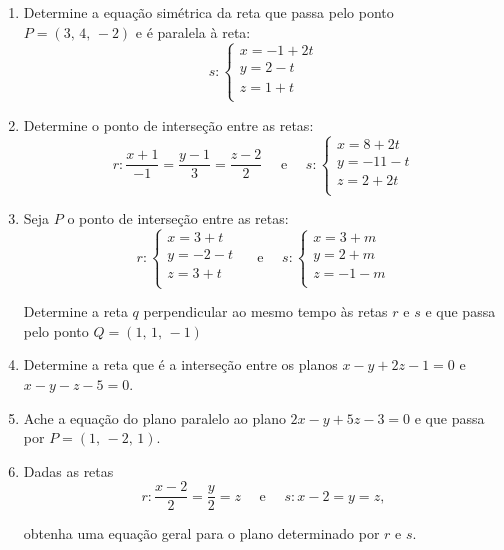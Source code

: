 \documentclass[12pt,a4paper]{article}
\begin{document}
\begin{enumerate}

 \item Determine a equação simétrica da reta que passa pelo ponto
 $P = (3,\, 4,\, -2)$ e é paralela à reta:
 $$
   s:\begin{cases}
       x = -1 + 2t\\
       y = 2 - t\\
       z = 1 + t\\
     \end{cases}
 $$
 
 \item Determine o ponto de interseção entre as retas:
 $$
   r: \dfrac{x + 1}{-1} = \dfrac{y - 1}{3} = \dfrac{z - 2}{2}
   \quad \textrm{ e }\quad
   s:\begin{cases}
     x = 8 + 2t\\
     y = -11 - t\\
     z = 2 + 2t\\
   \end{cases}
 $$ 

 \item Seja $P$ o ponto de interseção entre as retas:
 $$
   r:\begin{cases}
     x = 3 + t\\
     y = -2 - t\\
     z = 3 + t\\
   \end{cases}
   \quad \textrm{ e }\quad
   s:\begin{cases}
     x = 3 + m\\
     y = 2 + m\\
     z = -1 - m\\
   \end{cases}
 $$ 
 
 Determine a reta $q$ perpendicular ao mesmo tempo às retas $r$ e $s$ e que
 passa pelo ponto $Q = (1,\,1,\,-1)$

 \item Determine a reta que é a interseção entre os planos $x - y + 2z - 1 = 0$ 
 e $x - y - z - 5 = 0$.
  
 \item Ache a equação do plano paralelo ao plano $2x - y + 5z - 3 = 0$ e que 
 passa por $P = (1,\, -2,\, 1 )$.

 \item Dadas as retas
 $$
   r: \dfrac{x-2}{2} = \dfrac{y}{2} = z \quad \textrm{ e }\quad s: x - 2 = y = z,
 $$

 obtenha uma equação geral para o plano determinado por $r$ e $s$.


\end{enumerate}
\end{document}
